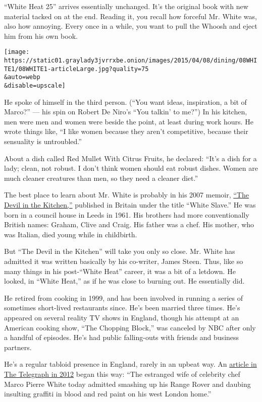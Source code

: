 ``White Heat 25'' arrives essentially unchanged. It's the original book
with new material tacked on at the end. Reading it, you recall how
forceful Mr. White was, also how annoying. Every once in a while, you
want to pull the Whoosh and eject him from his own book.

\texttt{[image: https://static01.graylady3jvrrxbe.onion/images/2015/04/08/dining/08WHITE1/08WHITE1-articleLarge.jpg?quality=75\\\&auto=webp\\\&disable=upscale]}

He spoke of himself in the third person. (``You want ideas, inspiration,
a bit of Marco?'' --- his spin on Robert De Niro's ``You talkin' to
me?'') In his kitchen, men were men and women were beside the point, at
least during work hours. He wrote things like, ``I like women because
they aren't competitive, because their sensuality is untroubled.''

About a dish called Red Mullet With Citrus Fruits, he declared: ``It's a
dish for a lady; clean, not robust. I don't think women should eat
robust dishes. Women are much cleaner creatures than men, so they need a
cleaner diet.''

The best place to learn about Mr. White is probably in his 2007 memoir,
\href{http://www.nytimes3xbfgragh.onion/2007/05/27/books/review/Kamp-t.html?pagewanted=1}{``The
Devil in the Kitchen,''} published in Britain under the title ``White
Slave.'' He was born in a council house in Leeds in 1961. His brothers
had more conventionally British names: Graham, Clive and Craig. His
father was a chef. His mother, who was Italian, died young while in
childbirth.

But ``The Devil in the Kitchen'' will take you only so close. Mr. White
has admitted it was written basically by his co-writer, James Steen.
Thus, like so many things in his post-``White Heat'' career, it was a
bit of a letdown. He looked, in ``White Heat,'' as if he was close to
burning out. He essentially did.

He retired from cooking in 1999, and has been involved in running a
series of sometimes short-lived restaurants since. He's been married
three times. He's appeared on several reality TV shows in England,
though his attempt at an American cooking show, ``The Chopping Block,''
was canceled by NBC after only a handful of episodes. He's had public
falling-outs with friends and business partners.

He's a regular tabloid presence in England, rarely in an upbeat way. An
\href{http://www.telegraph.co.uk/news/uknews/law-and-order/9589784/Marco-Pierre-Whites-wife-scrawled-insults-in-blood-on-wall-of-chefs-home.html}{article
in The Telegraph in 2012} began this way: ``The estranged wife of
celebrity chef Marco Pierre White today admitted smashing up his Range
Rover and daubing insulting graffiti in blood and red paint on his west
London home.''

